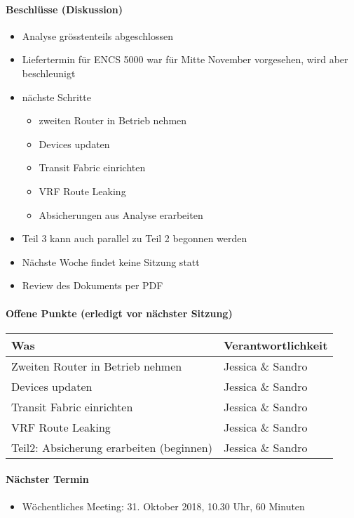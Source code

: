 \paragraph{Beschlüsse (Diskussion)}
\begin{itemize}	
	\item Analyse grösstenteils abgeschlossen
	\item Liefertermin für ENCS 5000 war für Mitte November vorgesehen, wird aber beschleunigt
	\item nächste Schritte
	\begin{itemize}
		\item zweiten Router in Betrieb nehmen
		\item Devices updaten
		\item Transit Fabric einrichten
		\item VRF Route Leaking
		\item Absicherungen aus Analyse erarbeiten
	\end{itemize}
	\item Teil 3 kann auch parallel zu Teil 2 begonnen werden
	\item Nächste Woche findet keine Sitzung statt
	\item Review des Dokuments per PDF
\end{itemize}

\paragraph{Offene Punkte (erledigt vor nächster Sitzung)} \mbox{}
\begin{table}[H]
	\centering
	\begin{tabularx}{\textwidth}{X | p{4.5cm}}
		\rowcolor{gray!50}
		\textbf{Was} & \textbf{Verantwortlichkeit} \\
		\hline	
		 Zweiten Router in Betrieb nehmen & Jessica \& Sandro \\
		 Devices updaten & Jessica \& Sandro \\
		 Transit Fabric einrichten & Jessica \& Sandro  \\
		 VRF Route Leaking & Jessica \& Sandro \\
		 Teil2: Absicherung erarbeiten (beginnen) & Jessica \& Sandro \\
	\end{tabularx}
	\label{tab:my-label}
\end{table}

\paragraph{Nächster Termin}
\begin{itemize}	
	\item Wöchentliches Meeting: 31. Oktober 2018, 10.30 Uhr, 60 Minuten
\end{itemize}

